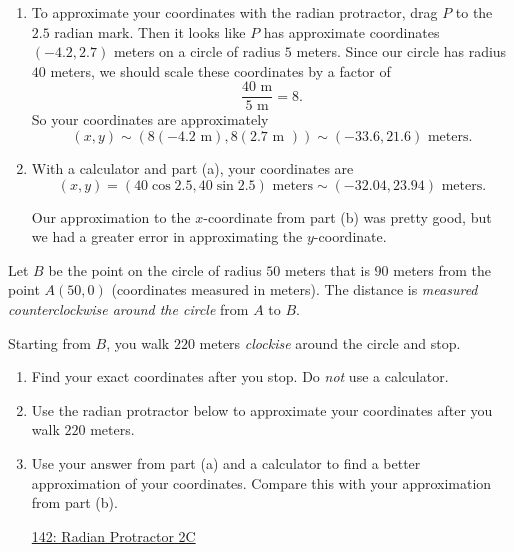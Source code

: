 \documentclass{ximera}
\begin{document}
\begin{example}
\begin{explanation}
\begin{enumerate}
\item To approximate your coordinates with the radian protractor, drag $P$ to the $2.5$ radian mark. Then it looks like $P$ has approximate coordinates $(-4.2 , 2.7)$ meters on a circle of radius $5$ meters. Since our circle has radius $40$ meters, we should scale these coordinates by a factor of 
\[
    \frac{40\text{ m}}{5\text{ m}} = 8.
\]
So your coordinates are approximately
\[
     (x,y) \sim (8(-4.2\text{ m}) , 8(2.7\text{ m })) \sim (-33.6 , 21.6 ) \text{ meters}.
\]

\item With a calculator and part (a), your coordinates are 
\[
   (x,y) = (40 \cos 2.5 , 40 \sin 2.5) \text{ meters} \sim (-32.04, 23.94 )\text{ meters}.
\]

Our approximation to the $x$-coordinate from part (b) was pretty good, but we had a greater error in approximating the $y$-coordinate.

\end{enumerate}

\end{explanation}


\end{example}



\begin{example}  \label{Exp89dsfrer94444}

Let $B$ be the point on the circle of radius $50$ meters that is $90$ meters from the point $A(50,0)$  (coordinates measured in meters). The distance is \emph{measured counterclockwise around the circle} from $A$ to $B$. 

Starting from $B$, you walk  $220$ meters \emph{clockise} around the circle and stop.

\begin{enumerate}

\item Find your exact coordinates after you stop. Do \emph{not} use a calculator.

\item Use the radian protractor below to approximate your coordinates after you walk $220$ meters.
 
\item Use your answer from part (a) and a calculator to find a better approximation of your coordinates. Compare this with your approximation from part (b).

\begin{onlineOnly}
    \begin{center}
\end{center}
\end{onlineOnly}

\href{https://www.desmos.com/calculator/lbkveixdno}{142: Radian Protractor 2C}

\end{enumerate}

\end{example}
\end{document}
